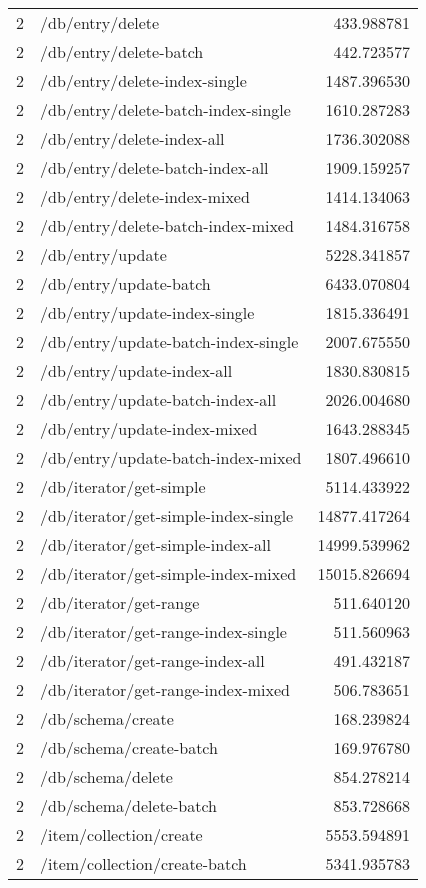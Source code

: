 \begin{longtable}{rlr}
2 & /db/entry/delete & 433.988781 \\
2 & /db/entry/delete-batch & 442.723577 \\
2 & /db/entry/delete-index-single & 1487.396530 \\
2 & /db/entry/delete-batch-index-single & 1610.287283 \\
2 & /db/entry/delete-index-all & 1736.302088 \\
2 & /db/entry/delete-batch-index-all & 1909.159257 \\
2 & /db/entry/delete-index-mixed & 1414.134063 \\
2 & /db/entry/delete-batch-index-mixed & 1484.316758 \\
2 & /db/entry/update & 5228.341857 \\
2 & /db/entry/update-batch & 6433.070804 \\
2 & /db/entry/update-index-single & 1815.336491 \\
2 & /db/entry/update-batch-index-single & 2007.675550 \\
2 & /db/entry/update-index-all & 1830.830815 \\
2 & /db/entry/update-batch-index-all & 2026.004680 \\
2 & /db/entry/update-index-mixed & 1643.288345 \\
2 & /db/entry/update-batch-index-mixed & 1807.496610 \\
2 & /db/iterator/get-simple & 5114.433922 \\
2 & /db/iterator/get-simple-index-single & 14877.417264 \\
2 & /db/iterator/get-simple-index-all & 14999.539962 \\
2 & /db/iterator/get-simple-index-mixed & 15015.826694 \\
2 & /db/iterator/get-range & 511.640120 \\
2 & /db/iterator/get-range-index-single & 511.560963 \\
2 & /db/iterator/get-range-index-all & 491.432187 \\
2 & /db/iterator/get-range-index-mixed & 506.783651 \\
2 & /db/schema/create & 168.239824 \\
2 & /db/schema/create-batch & 169.976780 \\
2 & /db/schema/delete & 854.278214 \\
2 & /db/schema/delete-batch & 853.728668 \\
2 & /item/collection/create & 5553.594891 \\
2 & /item/collection/create-batch & 5341.935783 \\

\end{longtable}
